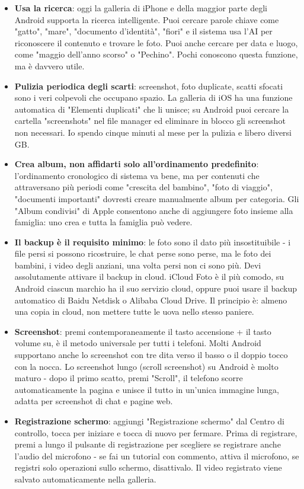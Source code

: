 \begin{itemize}
  \item \textbf{Usa la ricerca}: oggi la galleria di iPhone e della maggior parte degli Android supporta la ricerca intelligente. Puoi cercare parole chiave come "gatto", "mare", "documento d'identità", "fiori" e il sistema usa l'AI per riconoscere il contenuto e trovare le foto. Puoi anche cercare per data e luogo, come "maggio dell'anno scorso" o "Pechino". Pochi conoscono questa funzione, ma è davvero utile.
  \item \textbf{Pulizia periodica degli scarti}: screenshot, foto duplicate, scatti sfocati sono i veri colpevoli che occupano spazio. La galleria di iOS ha una funzione automatica di "Elementi duplicati" che li unisce; su Android puoi cercare la cartella "screenshots" nel file manager ed eliminare in blocco gli screenshot non necessari. Io spendo cinque minuti al mese per la pulizia e libero diversi GB.
  \item \textbf{Crea album, non affidarti solo all'ordinamento predefinito}: l'ordinamento cronologico di sistema va bene, ma per contenuti che attraversano più periodi come "crescita del bambino", "foto di viaggio", "documenti importanti" dovresti creare manualmente album per categoria. Gli "Album condivisi" di Apple consentono anche di aggiungere foto insieme alla famiglia: uno crea e tutta la famiglia può vedere.
  \item \textbf{Il backup è il requisito minimo}: le foto sono il dato più insostituibile - i file persi si possono ricostruire, le chat perse sono perse, ma le foto dei bambini, i video degli anziani, una volta persi non ci sono più. Devi assolutamente attivare il backup in cloud. iCloud Foto è il più comodo, su Android ciascun marchio ha il suo servizio cloud, oppure puoi usare il backup automatico di Baidu Netdisk o Alibaba Cloud Drive. Il principio è: almeno una copia in cloud, non mettere tutte le uova nello stesso paniere.
\end{itemize}


\begin{itemize}
  \item \textbf{Screenshot}: premi contemporaneamente il tasto accensione + il tasto volume su, è il metodo universale per tutti i telefoni. Molti Android supportano anche lo screenshot con tre dita verso il basso o il doppio tocco con la nocca. Lo screenshot lungo (scroll screenshot) su Android è molto maturo - dopo il primo scatto, premi "Scroll", il telefono scorre automaticamente la pagina e unisce il tutto in un'unica immagine lunga, adatta per screenshot di chat e pagine web.
  \item \textbf{Registrazione schermo}: aggiungi "Registrazione schermo" dal Centro di controllo, tocca per iniziare e tocca di nuovo per fermare. Prima di registrare, premi a lungo il pulsante di registrazione per scegliere se registrare anche l'audio del microfono - se fai un tutorial con commento, attiva il microfono, se registri solo operazioni sullo schermo, disattivalo. Il video registrato viene salvato automaticamente nella galleria.
\end{itemize}

